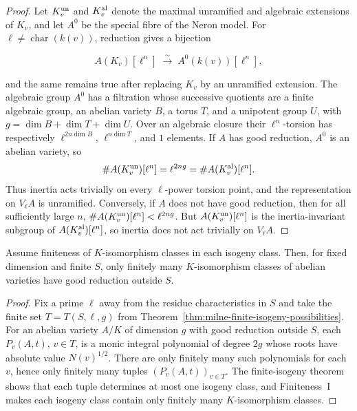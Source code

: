 \begin{proof}

Let $K_v^{\rm un}$ and $K_v^{\rm al}$ denote the maximal unramified and
algebraic extensions of $K_v$, and let $A^0$ be the special fibre of the
Neron model.  For $\ell\ne\operatorname{char}(k(v))$, reduction gives a
bijection

\[
A(K_v)[\ell^n]\;\xrightarrow{\sim}\;A^0(k(v))[\ell^n],
\]

and the same remains true after replacing $K_v$ by an unramified extension.
The algebraic group $A^0$ has a filtration whose successive quotients are a
finite algebraic group, an abelian variety $B$, a torus $T$, and a unipotent
group $U$, with
$g=\dim B+\dim T+\dim U$.  Over an algebraic closure their $\ell^n$-torsion
has respectively $\ell^{2n\dim B}$, $\ell^{n\dim T}$, and $1$ elements.
If $A$ has good reduction, $A^0$ is an abelian variety, so
\[
\#A(K_v^{\rm un})[\ell^n]=\ell^{2ng}
 =\#A(K_v^{\rm al})[\ell^n].
\]
Thus inertia acts trivially on every $\ell$-power torsion point, and the
representation on $V_\ell A$ is unramified.  Conversely, if $A$ does not
have good reduction, then for all sufficiently large $n$,
$\#A(K_v^{\rm un})[\ell^n]<\ell^{2ng}$.  But
$A(K_v^{\rm un})[\ell^n]$ is the inertia-invariant subgroup of
$A(K_v^{\rm al})[\ell^n]$, so inertia does not act trivially on
$V_\ell A$.

\end{proof}


\begin{theorem}
\label{thm:milne-finiteness-I-II}

Assume finiteness of $K$-isomorphism classes in each isogeny class.  Then, for
fixed dimension and finite $S$, only finitely many $K$-isomorphism classes of
abelian varieties have good reduction outside $S$.
\end{theorem}

\begin{proof}

Fix a prime $\ell$ away from the residue characteristics in $S$ and take the
finite set $T=T(S,\ell,g)$ from Theorem~\ref{thm:milne-finite-isogeny-possibilities}.
For an abelian variety $A/K$ of dimension $g$ with good reduction outside $S$,
each $P_v(A,t)$, $v\in T$, is a monic integral polynomial of degree $2g$ whose
roots have absolute value $N(v)^{1/2}$.  There are only finitely many such
polynomials for each $v$, hence only finitely many tuples
$(P_v(A,t))_{v\in T}$.  The finite-isogeny theorem shows that each tuple
determines at most one isogeny class, and Finiteness~I makes each isogeny class
contain only finitely many $K$-isomorphism classes.

\end{proof}


